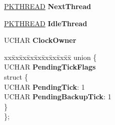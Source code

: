 \begin{DoxyCompactItemize}
\item 
\mbox{\label{struct___k_p_r_c_b_aa12ac68329f8cd43fdc97d8b08bb0cb5}} 
\hyperlink{struct___k_t_h_r_e_a_d}{P\+K\+T\+H\+R\+E\+AD} {\bfseries Next\+Thread}
\item 
\mbox{\label{struct___k_p_r_c_b_a75f9765f32df88d525ea0219bfe80a78}} 
\hyperlink{struct___k_t_h_r_e_a_d}{P\+K\+T\+H\+R\+E\+AD} {\bfseries Idle\+Thread}
\item 
\mbox{\label{struct___k_p_r_c_b_a634a37db9bc29ada507b85491baf9fa2}} 
U\+C\+H\+AR {\bfseries Clock\+Owner}
\item 
\mbox{\label{struct___k_p_r_c_b_ae4584f663b38a903f14bd7880912ba99}} 
\begin{tabbing}
xx\=xx\=xx\=xx\=xx\=xx\=xx\=xx\=xx\=\kill
union \{\\
\>UCHAR {\bfseries PendingTickFlags}\\
\mbox{\label{union___k_p_r_c_b_1_1_0D1950_aad8ddc7fc40c1b6e08ab985a287b654d}} 
\>struct \{\\
\>\>UCHAR {\bfseries PendingTick}: 1\\
\>\>UCHAR {\bfseries PendingBackupTick}: 1\\
\>\} \\
\}; \\


\end{tabbing}
\end{DoxyCompactItemize}
